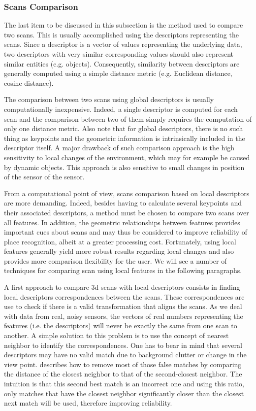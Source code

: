 \subsubsection{Scans Comparison}
\label{ssub:scans_comparison}

The last item to be discussed in this subsection is the method used to compare two scans. This is usually accomplished using the descriptors representing the scans. Since a descriptor is a vector of values representing the underlying data, two descriptors with very similar corresponding values should also represent similar entities (e.g. objects). Consequently, similarity between descriptors are generally computed using a simple distance metric (e.g. Euclidean distance, cosine distance).

The comparison between two scans using global descriptors is usually computationally inexpensive. Indeed, a single descriptor is computed for each scan and the comparison between two of them simply requires the computation of only one distance metric. Also note that for global descriptors, there is no such thing as keypoints and the geometric information is intrinsically included in the descriptor itself. A major drawback of such comparison approach is the high sensitivity to local changes of the environment, which may for example be caused by dynamic objects. This approach is also sensitive to small changes in position of the sensor of the sensor.

From a computational point of view, scans comparison based on local descriptors are more demanding. Indeed, besides having to calculate several keypoints and their associated descriptors, a method must be chosen to compare two scans over all features. In addition, the geometric relationships between features provides important cues about scans and may thus be considered to improve reliability of place recognition, albeit at a greater processing cost. Fortunately, using local features generally yield more robust results regarding local changes and also provides more comparison flexibility for the user. We will see a number of techniques for comparing scan using local features in the following paragraphs.

A first approach to compare \gls*{3d} scans with local descriptors consists in finding local descriptors correspondences between the scans. These correspondences are use to check if there is a valid transformation that aligns the scans. As we deal with data from real, noisy sensors, the vectors of real numbers representing the features (i.e. the descriptors) will never be exactly the same from one scan to another. A simple solution to this problem is to use the concept of nearest neighbor to identify the correspondences. One has to bear in mind that several descriptors may have no valid match due to background clutter or change in the view point. \cite[Section 7.1]{Lowe2004} describes how to remove most of those false matches by comparing the distance of the closest neighbor to that of the second-closest neighbor. The intuition is that this second best match is an incorrect one and using this ratio, only matches that have the closest neighbor significantly closer than the closest next match will be used, therefore improving reliability.

